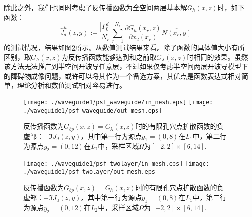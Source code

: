除此之外，我们也同时考虑了反传播函数为全空间两层基本解$G_h(x,z)$时，如下函数：
\begin{equation}
  \hat J_d^h(z,y):=\frac{|\Gamma_0^d|}{N_r}\sum\limits_{r=1}^{N_r}\frac{\partial G_h(x_r,z)}{\partial x_2(x_r)}\overline{N(x_r,y)}
\end{equation}
的测试情况，结果如图\ref{fig_psf_twolayer}所示。从数值测试结果来看，除了函数的具体值大小有所区别，取$G_h(x,z)$为反传播函数能够达到和之前取$G_{\lambda}(x,z)$时相同的效果。虽然该方法无法推广到半空间开波导任意层，不过如果仅考虑半空间两层开波导模型下的障碍物成像问题，或许可以将其作为一个备选方案，其优点是函数表达式相对简单，理论分析和数值测试相对容易进行。
\begin{figure}[h]
  \centering
  \texttt{[image: ./waveguide1/psf\_waveguide/in\_mesh.eps]}
    \texttt{[image: ./waveguide1/psf\_waveguide/out\_mesh.eps]}
  \caption{反传播函数为$G_{bp}(x,z)=G_{\lambda}(x,z)$时的有限孔穴点扩散函数的负虚部：$-\Im J_d(z,y)$，其中第一行为源点$y_1=(0,8)$在$ L_1$中，第二行为源点$y_2=(0,12)$在$ L_2$中，采样区域$\Omega$为$[-2,2]\times[6,14]$.}\label{fig_psf_impedance}
\end{figure}
\begin{figure}[h]
  \centering
  \texttt{[image: ./waveguide1/psf\_twolayer/in\_mesh.eps]}
    \texttt{[image: ./waveguide1/psf\_twolayer/out\_mesh.eps]}
  \caption{反传播函数为$G_{bp}(x,z)=G_h(x,z)$时的有限孔穴点扩散函数的负虚部：$-\Im J_d(z,y)$，其中第一行为源点$y_1=(0,8)$在$ L_1$中，第二行为源点$y_2=(0,12)$在$ L_2$中，采样区域$\Omega$为$[-2,2]\times[6,14]$.}\label{fig_psf_twolayer}
\end{figure}

